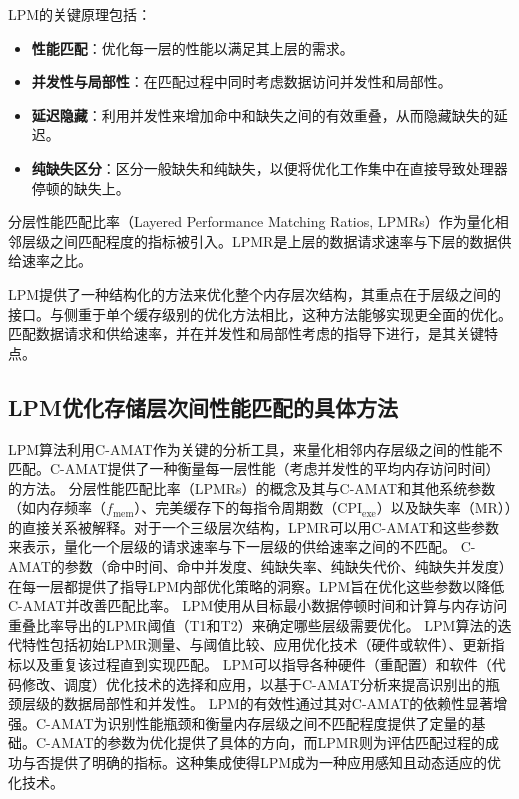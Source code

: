 \documentclass[UTF8]{ctexart}
\begin{document}
LPM的关键原理包括\cite{liu2024lpm}：
\begin{itemize}
    \item \textbf{性能匹配}：优化每一层的性能以满足其上层的需求。
    \item \textbf{并发性与局部性}：在匹配过程中同时考虑数据访问并发性和局部性\cite{liu2024lpm}。
    \item \textbf{延迟隐藏}：利用并发性来增加命中和缺失之间的有效重叠，从而隐藏缺失的延迟\cite{liu2024lpm}。
    \item \textbf{纯缺失区分}：区分一般缺失和纯缺失，以便将优化工作集中在直接导致处理器停顿的缺失上\cite{liu2024lpm}。
\end{itemize}
分层性能匹配比率（Layered Performance Matching Ratios, LPMRs）作为量化相邻层级之间匹配程度的指标被引入\cite{liu2024lpm}。LPMR是上层的数据请求速率与下层的数据供给速率之比\cite{liu2024lpm}。

LPM提供了一种结构化的方法来优化整个内存层次结构，其重点在于层级之间的接口。与侧重于单个缓存级别的优化方法相比，这种方法能够实现更全面的优化。匹配数据请求和供给速率，并在并发性和局部性考虑的指导下进行，是其关键特点。

\subsection{LPM优化存储层次间性能匹配的具体方法}
LPM算法利用C-AMAT作为关键的分析工具，来量化相邻内存层级之间的性能不匹配\cite{sun2018optimizing}。C-AMAT提供了一种衡量每一层性能（考虑并发性的平均内存访问时间）的方法\cite{liu2024lpm}。
分层性能匹配比率（LPMRs）的概念及其与C-AMAT和其他系统参数（如内存频率（$f_{\text{mem}}$）、完美缓存下的每指令周期数（CPI$_{\text{exe}}$）以及缺失率（MR））的直接关系被解释\cite{liu2024lpm}。对于一个三级层次结构，LPMR可以用C-AMAT和这些参数来表示，量化一个层级的请求速率与下一层级的供给速率之间的不匹配\cite{liu2024lpm}。
C-AMAT的参数（命中时间、命中并发度、纯缺失率、纯缺失代价、纯缺失并发度）在每一层都提供了指导LPM内部优化策略的洞察\cite{liu2024lpm}。LPM旨在优化这些参数以降低C-AMAT并改善匹配比率。
LPM使用从目标最小数据停顿时间和计算与内存访问重叠比率导出的LPMR阈值（T1和T2）来确定哪些层级需要优化\cite{liu2024lpm}。
LPM算法的迭代特性包括初始LPMR测量、与阈值比较、应用优化技术（硬件或软件）、更新指标以及重复该过程直到实现匹配\cite{sunCAMATPage}。
LPM可以指导各种硬件（重配置）和软件（代码修改、调度）优化技术的选择和应用，以基于C-AMAT分析来提高识别出的瓶颈层级的数据局部性和并发性\cite{liu2024lpm}。
LPM的有效性通过其对C-AMAT的依赖性显著增强。C-AMAT为识别性能瓶颈和衡量内存层级之间不匹配程度提供了定量的基础。C-AMAT的参数为优化提供了具体的方向，而LPMR则为评估匹配过程的成功与否提供了明确的指标。这种集成使得LPM成为一种应用感知且动态适应的优化技术。
\end{document}
